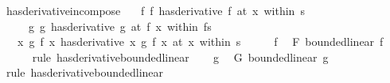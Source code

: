 \begin{isabellebody}
\endisatagproof
{\isafoldproof}%
%
\isadelimproof
\isanewline
%
\endisadelimproof
\isanewline
{}\isamarkupfalse%
\ has{\isacharunderscore}{\kern0pt}derivative{\isacharunderscore}{\kern0pt}in{\isacharunderscore}{\kern0pt}compose{\isacharcolon}{\kern0pt}\isanewline
\ \ \ f{\isacharcolon}{\kern0pt}\ {\isachardoublequoteopen}{\isacharparenleft}{\kern0pt}f\ has{\isacharunderscore}{\kern0pt}derivative\ f{\isacharprime}{\kern0pt}{\isacharparenright}{\kern0pt}\ {\isacharparenleft}{\kern0pt}at\ x\ within\ s{\isacharparenright}{\kern0pt}{\isachardoublequoteclose}\isanewline
\ \ \ \ \ g{\isacharcolon}{\kern0pt}\ {\isachardoublequoteopen}{\isacharparenleft}{\kern0pt}g\ has{\isacharunderscore}{\kern0pt}derivative\ g{\isacharprime}{\kern0pt}{\isacharparenright}{\kern0pt}\ {\isacharparenleft}{\kern0pt}at\ {\isacharparenleft}{\kern0pt}f\ x{\isacharparenright}{\kern0pt}\ within\ {\isacharparenleft}{\kern0pt}f{\isacharbackquote}{\kern0pt}s{\isacharparenright}{\kern0pt}{\isacharparenright}{\kern0pt}{\isachardoublequoteclose}\isanewline
\ \ \ {\isachardoublequoteopen}{\isacharparenleft}{\kern0pt}{\isacharparenleft}{\kern0pt}{\isasymlambda}x{\isachardot}{\kern0pt}\ g\ {\isacharparenleft}{\kern0pt}f\ x{\isacharparenright}{\kern0pt}{\isacharparenright}{\kern0pt}\ has{\isacharunderscore}{\kern0pt}derivative\ {\isacharparenleft}{\kern0pt}{\isasymlambda}x{\isachardot}{\kern0pt}\ g{\isacharprime}{\kern0pt}\ {\isacharparenleft}{\kern0pt}f{\isacharprime}{\kern0pt}\ x{\isacharparenright}{\kern0pt}{\isacharparenright}{\kern0pt}{\isacharparenright}{\kern0pt}\ {\isacharparenleft}{\kern0pt}at\ x\ within\ s{\isacharparenright}{\kern0pt}{\isachardoublequoteclose}\isanewline
%
\isadelimproof
%
\endisadelimproof
%
\isatagproof
{}\isamarkupfalse%
\ {\isacharminus}{\kern0pt}\isanewline
\ \ \isamarkupfalse%
\ f\ \isamarkupfalse%
\ F{\isacharcolon}{\kern0pt}\ bounded{\isacharunderscore}{\kern0pt}linear\ f{\isacharprime}{\kern0pt}\isanewline
\ \ \ \ \isamarkupfalse%
\ {\isacharparenleft}{\kern0pt}rule\ has{\isacharunderscore}{\kern0pt}derivative{\isacharunderscore}{\kern0pt}bounded{\isacharunderscore}{\kern0pt}linear{\isacharparenright}{\kern0pt}\isanewline
\ \ \isamarkupfalse%
\ g\ \isamarkupfalse%
\ G{\isacharcolon}{\kern0pt}\ bounded{\isacharunderscore}{\kern0pt}linear\ g{\isacharprime}{\kern0pt}\isanewline
\ \ \ \ \isamarkupfalse%
\ {\isacharparenleft}{\kern0pt}rule\ has{\isacharunderscore}{\kern0pt}derivative{\isacharunderscore}{\kern0pt}bounded{\isacharunderscore}{\kern0pt}linear{\isacharparenright}{\kern0pt}\isanewline

\end{isabellebody}
